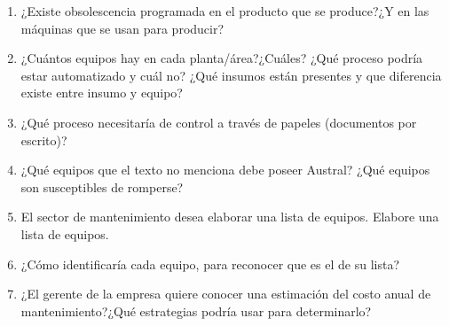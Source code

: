 \documentclass[../main]{subfiles}
\begin{document}
\begin{enumerate}
    \item ¿Existe obsolescencia programada en el producto que se produce?¿Y en las máquinas que se usan para producir? 
    \item ¿Cuántos equipos hay en cada planta/área?¿Cuáles? ¿Qué proceso podría estar automatizado y cuál no? ¿Qué insumos están presentes y que diferencia existe entre insumo y equipo?
    \item ¿Qué proceso necesitaría de control a través de papeles (documentos por escrito)?
    \item ¿Qué equipos que el texto no menciona debe poseer Austral? ¿Qué equipos son susceptibles de romperse?
    \item El sector de mantenimiento desea elaborar una lista de equipos. Elabore una lista de equipos.
    \item ¿Cómo identificaría cada equipo, para reconocer que es el de su lista?
    \item ¿El gerente de la empresa quiere conocer una estimación del costo anual de mantenimiento?¿Qué estrategias podría usar para determinarlo?
\end{enumerate}
\end{document}

